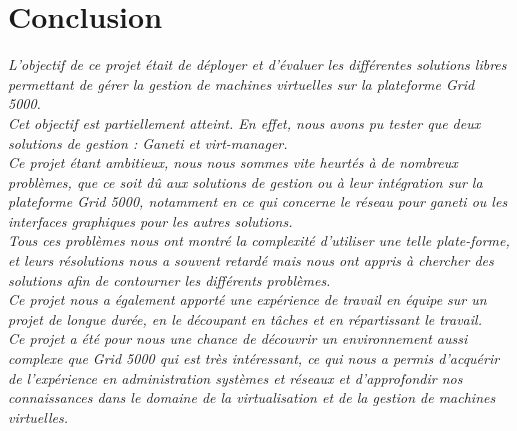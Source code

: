 \chapter{Conclusion}
\emph{L'objectif de ce projet était de déployer et d'évaluer les différentes solutions libres permettant de gérer la gestion de machines virtuelles sur la plateforme Grid 5000.\\
Cet objectif est partiellement atteint. En effet, nous avons pu tester que deux solutions de gestion : Ganeti et virt-manager.\\
Ce projet étant ambitieux, nous nous sommes vite heurtés à de nombreux problèmes, que ce soit dû aux solutions de gestion ou à leur intégration sur la plateforme Grid 5000, notamment en ce qui concerne le réseau pour ganeti ou les interfaces graphiques pour les autres solutions.\\
Tous ces problèmes nous ont montré la complexité d'utiliser une telle plate-forme, et leurs résolutions nous a souvent retardé mais nous ont appris à chercher des solutions afin de contourner les différents problèmes.\\
Ce projet nous a également apporté une expérience de travail en équipe sur un projet de longue durée, en le découpant en tâches et en répartissant le travail.\\
Ce projet a été pour nous une chance de découvrir un environnement aussi complexe que Grid 5000 qui est très intéressant, ce qui nous a permis d'acquérir de l'expérience en administration systèmes et réseaux et d'approfondir nos connaissances dans le domaine de la virtualisation et de la gestion de machines virtuelles.}
